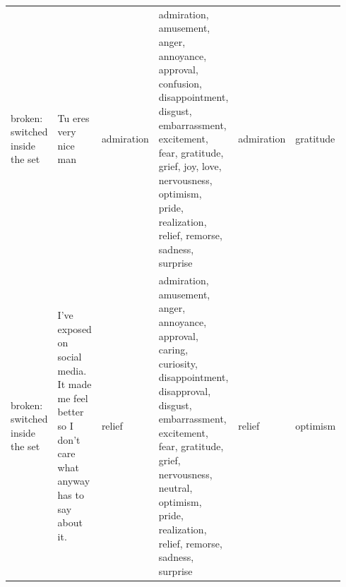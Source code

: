 \begin{tabular}{p{0.14\linewidth}p{0.36\linewidth}p{0.08\linewidth}p{0.2\linewidth}p{0.08\linewidth}p{0.08\linewidth}}
broken: switched inside the set & Tu eres very nice man & admiration & admiration, amusement, anger, annoyance, approval, confusion, disappointment, disgust, embarrassment, excitement, fear, gratitude, grief, joy, love, nervousness, optimism, pride, realization, relief, remorse, sadness, surprise & admiration & gratitude \\
broken: switched inside the set & I've exposed on social media. It made me feel better so I don't care what anyway has to say about it. & relief & admiration, amusement, anger, annoyance, approval, caring, curiosity, disappointment, disapproval, disgust, embarrassment, excitement, fear, gratitude, grief, nervousness, neutral, optimism, pride, realization, relief, remorse, sadness, surprise & relief & optimism \\
\bottomrule
\end{tabular}
